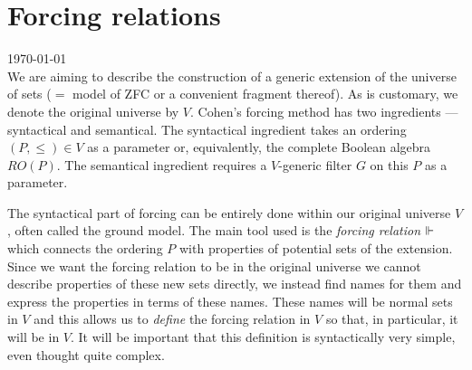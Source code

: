 \cfoot{}\rhead{\thepage}

%


\thispagestyle{empty}

\section{Forcing relations}\label{forcing-relations}

{\tiny \today } \\[0.5cm]

We are aiming to describe the construction of a generic extension of the universe of sets ($=$ model of ZFC or a convenient fragment thereof). As is customary, we
denote the original universe by $V$. Cohen's forcing method has two ingredients --- syntactical and semantical. The syntactical ingredient takes an ordering $(P,\leq)\in V$ as a parameter or, equivalently, the complete Boolean algebra $RO(P)$. The semantical ingredient requires a $V$-generic filter $G$ on this $P$ as a parameter.

\smallskip

The syntactical part of forcing can be entirely done within our original universe $V$, often called the ground model. The main tool used is the \emph{forcing relation} $\Vdash$ which
connects the ordering $P$ with properties of potential sets of the extension. Since we want the forcing relation to be in the original
universe we cannot describe properties of these new sets directly, we instead find names for them and express the properties in terms of these names. These names will be
normal sets in $V$ and this allows us to \emph{define} the forcing relation in $V$ so that, in particular, it will be in $V$. It will be important that this definition
is syntactically very simple, even thought
quite complex.

